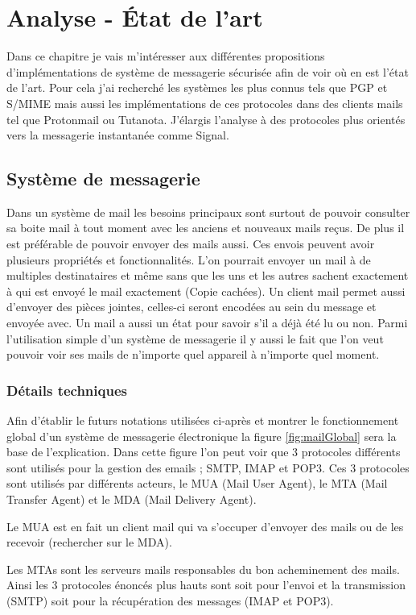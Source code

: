 \chapter{Analyse - État de l'art}
\label{ch:analysis}
Dans ce chapitre je vais m'intéresser aux différentes propositions d'implémentations de système de messagerie sécurisée afin de voir où en est l'état de l'art. Pour cela j'ai recherché les systèmes les plus connus tels que PGP et S/MIME mais aussi les implémentations de ces protocoles dans des clients mails tel que Protonmail ou Tutanota. J'élargis l'analyse à des protocoles plus orientés vers la messagerie instantanée comme Signal.
\section{Système de messagerie}
Dans un système de mail les besoins principaux sont surtout de pouvoir consulter sa boite mail à tout moment avec les anciens et nouveaux mails reçus. De plus il est préférable de pouvoir envoyer des mails aussi. Ces envois peuvent avoir plusieurs propriétés et fonctionnalités. L'on pourrait envoyer un mail à de multiples destinataires et même sans que les uns et les autres sachent exactement à qui est envoyé le mail exactement (Copie cachées). Un client mail permet aussi d'envoyer des pièces jointes, celles-ci seront encodées au sein du message et envoyée avec. Un mail a aussi un état pour savoir s'il a déjà été lu ou non. Parmi l'utilisation simple d'un système de messagerie il y aussi le fait que l'on veut pouvoir voir ses mails de n'importe quel appareil à n'importe quel moment. 
\subsection{Détails techniques}
Afin d'établir le futurs notations utilisées ci-après et montrer le fonctionnement global d'un système de messagerie électronique la figure \ref{fig:mailGlobal} sera la base de l'explication. Dans cette figure l'on peut voir que 3 protocoles différents sont utilisés pour la gestion des emails ; SMTP, IMAP et POP3. Ces 3 protocoles sont utilisés par différents acteurs, le MUA (Mail User Agent), le MTA (Mail Transfer Agent) et le MDA (Mail Delivery Agent).

Le MUA est en fait un client mail qui va s'occuper d'envoyer des mails ou de les recevoir (rechercher sur le MDA). 
 
 Les MTAs sont les serveurs mails responsables du bon acheminement des mails. Ainsi les 3 protocoles énoncés plus hauts sont soit pour l'envoi et la transmission (SMTP) soit pour la récupération des messages (IMAP et POP3). 
 
